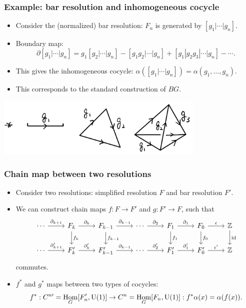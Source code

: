 \documentclass[xcolor=table, aspectratio=43,ignorenonframetext]{beamer}
\DeclareMathOperator{\hhom}{Hom}
\newcommand{\uone}{\text U(1)}
\DeclareMathOperator{\id}{id}
\begin{document}
\begin{frame}
	\frametitle{Example: bar resolution and inhomogeneous cocycle}
	\begin{itemize}
		\item Consider the (normalized) bar resolution:
		$F_n$ is generated by $[g_1|\cdots|g_n]$.
		\item Boundary map:
		\[\partial[g_1|\cdots|g_n]=g_1[g_2|\cdots|g_n]
		-[g_1g_2|\cdots|g_n]+[g_1|g_2g_3|\cdots|g_n]-\cdots.\]
		\item This gives the inhomogeneous cocycle:
		$\alpha([g_1|\cdots|g_n])=\alpha(g_1,\ldots,g_n)$.
		\item This corresponds to the standard construction of $BG$.
	\end{itemize}
\begin{center}
	\includegraphics[width=10cm]{../chainmap/bg-std}
\end{center}
\end{frame}

\begin{frame}[fragile]
	\frametitle{Chain map between two resolutions}
	\begin{itemize}
		\item Consider two resolutions: simplified resolution $F$ and bar resolution $F'$.
		\item We can construct chain maps $f:F\rightarrow F'$ and $g:F'\rightarrow F$, such that
		\[\begin{tikzcd}
		\cdots\arrow[r,"\partial_{k+1}"]&
		F_k\arrow[r,"\partial_k"]\arrow[d,"f_k"]&
		F_{k-1}\arrow[r,"\partial_{k-1}"]\arrow[d,"f_{k-1}"]&
		\cdots\arrow[r,"\partial_2"]&
		F_1\arrow[r,"\partial_1"]\arrow[d,"f_1"]&
		F_0\arrow[r,"\epsilon"]\arrow[d,"f_0"]&
		\mathbb Z\arrow[d,"\id"]\\
		\cdots\arrow[r,"\partial_{k+1}'"]&
		F_k'\arrow[r,"\partial_k'"]&
		F_{k-1}'\arrow[r,"\partial_{k-1}"]&
		\cdots\arrow[r,"\partial_2'"]&
		F_1'\arrow[r,"\partial_1'"]&
		F_0'\arrow[r,"\epsilon'"]&
		\mathbb Z
		\end{tikzcd}\]
		commutes.
		\item $f^\ast$ and $g^\ast$ maps between two types of cocycles:
		\[f^\ast:C^{n\prime} = \hhom_G[F^\prime_n,\uone]\rightarrow C^n=\hhom_G[F_n,\uone]:
		f^\ast\alpha(x)=\alpha(f(x)).\]
	\end{itemize}
\end{frame}
\end{document}

